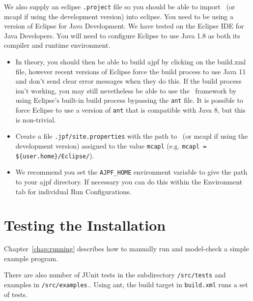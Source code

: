 We also supply an eclipse \texttt{.project} file so you should be able to import \ajpfversion\ (or mcapl if using the development version)  into eclipse.  You need to be using a version of Eclipse for Java Development.  We have tested on the Eclipse IDE for Java Developers.  You will need to configure Eclipse to use Java 1.8 as both its compiler and runtime environment. 
\begin{itemize}
\item In theory, you should then be able to build ajpf by clicking on the build.xml file, however recent versions of Eclipse force the build process to use Java 11 and don't send clear error messages when they do this.  If the build process isn't working, you may still nevetheless be able to use the \mcapl\ framework by using Eclipse's built-in build process bypassing the \texttt{ant} file.  It is possible to force Eclipse to use a version of \texttt{ant} that is compatible with Java 8, but this is non-trivial.
\item Create a file \texttt{.jpf/site.properties} with the path to \ajpfversion\ (or mcapl if using the development version)  assigned to the value \texttt{mcapl} (e.g. \texttt{mcapl = \$\{user.home\}/Eclipse/\ajpfversion}).
\item We recommend you set the \texttt{AJPF\_HOME} environment variable to give the path to your ajpf directory.  If necessary you can do this within the Environment tab for individual Run Configurations.
\end{itemize}

\section{Testing the Installation}

Chapter~\ref{chap:running} describes how to manually run and model-check a simple example program.

There are also number of JUnit tests in the subdirectory \texttt{/src/tests} and examples in \texttt{/src/examples}..  Using ant, the build target in \texttt{build.xml} runs a set of tests.

